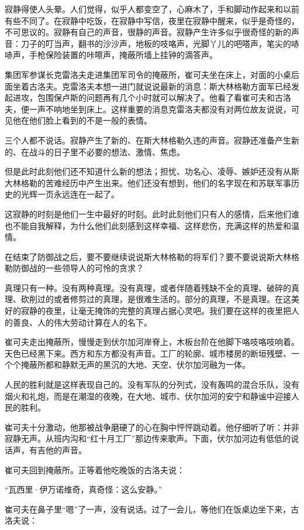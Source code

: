 寂静得使人头晕。人们觉得，似乎人都变空了，心麻木了，手和脚动作起来和以前有些不同了。在寂静中吃饭，在寂静中写信，夜里在寂静中醒来，似乎是奇怪的，不可思议的。寂静有自己的声音，很静的声音。寂静产生许多似乎很奇怪的新的声音：刀子的叮当声，翻书的沙沙声，地板的吱咯声，光脚丫儿的吧嗒声，笔尖的哧哧声，手枪保险装置的咔嚓声，掩蔽所墙上挂钟的滴答声。

集团军参谋长克雷洛夫走进集团军司令的掩蔽所，崔可夫坐在床上，对面的小桌后面坐着古洛夫。克雷洛夫本想一进门就说说最新的消息：斯大林格勒方面军已经发起进攻，包围保卢斯的问题再有几个小时就可以解决了。他看了看崔可夫和古洛夫，便一声不响地坐到床上。这样重要的消息克雷洛夫都没有对两位故友说说，可见他在他们脸上看到的不是一般的表情。

三个人都不说话。寂静产生了新的、在斯大林格勒久违的声音。寂静还准备产生新的、在战斗的日子里不必要的想法、激情、焦虑。

但是此时此刻他们还不知道什么新的想法；担忧、功名心、凌辱、嫉妒还没有从斯大林格勒的苦难经历中产生出来。他们还没有想到，他们的名字现在和苏联军事历史的光辉一页永远连在一起了。

这寂静的时刻是他们一生中最好的时刻。此时此刻他们只有人的感情，后来他们谁也不能自我解释，为什么他们此刻感到这样幸福、这样悲伤，充满这样的热爱和温情。

在结束了防御战之后，要不要继续说说斯大林格勒的将军们？要不要说说斯大林格勒防御战的一些领导人的可怜的贪求？

真理只有一种。没有两种真理。没有真理，或者伴随着残缺不全的真理、破碎的真理、砍削过的或者修剪过的真理，是很难生活的。部分的真理，不是真理。在这美好的寂静的夜里，让毫无掩饰的完整的真理占据心灵吧。我们要在这样的夜里把人的善良、人的伟大劳动计算在人的名下。

崔可夫走出掩蔽所，慢慢走到伏尔加河岸脊上，木板台阶在他脚下咯吱咯吱响着。天色已经黑下来。西方和东方都没有声音。工厂的轮廓、城市楼房的断垣残壁、一个个掩蔽所都和静默无声的黑沉的大地、天空、伏尔加河融为一体。

人民的胜利就是这样表现自己的。没有军队的分列式，没有轰鸣的混合乐队，没有烟火和礼炮，而是在潮湿的夜晚，在大地、城市、伏尔加河的安宁和静谧中迎接人民的胜利。

崔可夫十分激动，他那被战争磨硬了的心在胸中怦怦跳动着。他仔细听了听：并非寂静无声。从班内沟和“红十月工厂”那边传来歌声。下面，伏尔加河边有低低的说话声，有吉他的声音。

崔可夫回到掩蔽所。正等着他吃晚饭的古洛夫说：

“瓦西里·伊万诺维奇，真奇怪：这么安静。”

崔可夫在鼻子里“嗯”了一声，没有说话。过了一会儿，等他们在饭桌边坐下来，古洛夫说：

